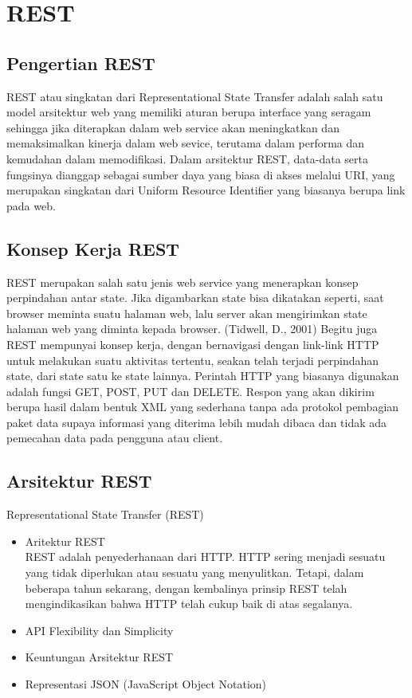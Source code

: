 

\section{REST}
\subsection{Pengertian REST}
REST atau singkatan dari Representational State Transfer adalah salah satu model arsitektur web yang memiliki aturan berupa interface yang seragam sehingga jika diterapkan dalam web service akan meningkatkan dan memaksimalkan kinerja dalam web sevice, terutama dalam performa dan kemudahan dalam memodifikasi. Dalam arsitektur REST, data-data serta fungsinya dianggap sebagai sumber daya yang biasa di akses melalui URI, yang merupakan singkatan dari Uniform Resource Identifier yang biasanya berupa link pada web.
\subsection{Konsep Kerja REST}
REST merupakan salah satu jenis web service yang menerapkan konsep perpindahan antar state. Jika digambarkan state bisa dikatakan seperti, saat browser meminta suatu halaman web, lalu server akan mengirimkan state halaman web yang diminta kepada browser. (Tidwell, D., 2001) Begitu juga REST mempunyai konsep kerja, dengan bernavigasi dengan link-link HTTP untuk melakukan suatu aktivitas tertentu, seakan telah terjadi perpindahan state, dari state satu ke state lainnya. Perintah  HTTP yang biasanya digunakan adalah fungsi GET, POST, PUT dan DELETE. Respon yang akan dikirim berupa hasil dalam bentuk XML yang sederhana tanpa ada protokol pembagian paket data supaya informasi yang diterima lebih mudah dibaca dan tidak ada pemecahan data pada pengguna atau client.
\subsection{Arsitektur REST}
Representational State Transfer (REST)
\begin{itemize}
\item Aritektur REST \\
REST adalah penyederhanaan dari HTTP. HTTP sering menjadi sesuatu yang tidak diperlukan atau sesuatu yang menyulitkan. Tetapi, dalam beberapa tahun sekarang, dengan kembalinya prinsip REST telah mengindikasikan bahwa HTTP telah cukup baik di atas segalanya.
\item API Flexibility dan Simplicity 
\item Keuntungan Arsitektur REST 
\item Representasi JSON (JavaScript Object Notation) 
\end{itemize}
